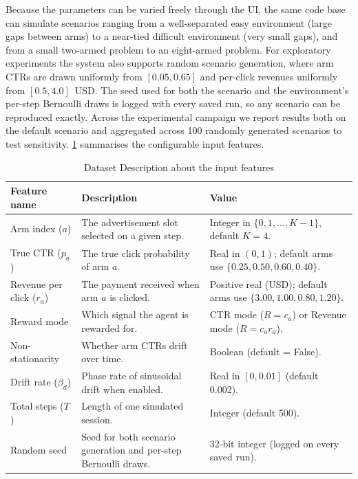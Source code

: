 Because the parameters can be varied freely through the UI, the same code base can simulate scenarios ranging from a well-separated easy environment (large gaps between arms) to a near-tied difficult environment (very small gaps), and from a small two-armed problem to an eight-armed problem. For exploratory experiments the system also supports random scenario generation, where arm CTRs are drawn uniformly from $[0.05, 0.65]$ and per-click revenues uniformly from $[0.5, 4.0]$~USD. The seed used for both the scenario and the environment's per-step Bernoulli draws is logged with every saved run, so any scenario can be reproduced exactly. Across the experimental campaign we report results both on the default scenario and aggregated across 100 randomly generated scenarios to test sensitivity. \cref{tab:features} summarises the configurable input features.

\begin{table}[H]
\centering
\caption{Dataset Description about the input features}
\label{tab:features}
\renewcommand{\arraystretch}{1.3}
\begin{tabularx}{\linewidth}{|p{3.5cm}|X|X|}
\hline
\rowcolor{tabhead}\textbf{Feature name} & \textbf{Description} & \textbf{Value}\\
\hline
Arm index ($a$)              & The advertisement slot selected on a given step. & Integer in $\{0,1,\ldots,K-1\}$, default $K=4$.\\
\hline
True CTR ($p_a$)             & The true click probability of arm $a$. & Real in $(0,1)$; default arms use $\{0.25, 0.50, 0.60, 0.40\}$.\\
\hline
Revenue per click ($r_a$)    & The payment received when arm $a$ is clicked. & Positive real (USD); default arms use $\{3.00, 1.00, 0.80, 1.20\}$.\\
\hline
Reward mode                  & Which signal the agent is rewarded for. & CTR mode ($R=c_a$) or Revenue mode ($R = c_a r_a$).\\
\hline
Non-stationarity             & Whether arm CTRs drift over time. & Boolean (default = False).\\
\hline
Drift rate ($\beta_d$)       & Phase rate of sinusoidal drift when enabled. & Real in $[0, 0.01]$ (default 0.002).\\
\hline
Total steps ($T$)            & Length of one simulated session. & Integer (default 500).\\
\hline
Random seed                  & Seed for both scenario generation and per-step Bernoulli draws. & 32-bit integer (logged on every saved run).\\
\hline
\end{tabularx}
\end{table}

